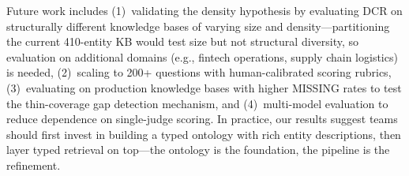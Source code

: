 \documentclass[11pt,a4paper]{article}
\begin{document}
Future work includes (1)~validating the density hypothesis by evaluating DCR on structurally different knowledge bases of varying size and density---partitioning the current 410-entity KB would test size but not structural diversity, so evaluation on additional domains (e.g., fintech operations, supply chain logistics) is needed, (2)~scaling to 200+ questions with human-calibrated scoring rubrics, (3)~evaluating on production knowledge bases with higher MISSING rates to test the thin-coverage gap detection mechanism, and (4)~multi-model evaluation to reduce dependence on single-judge scoring. In practice, our results suggest teams should first invest in building a typed ontology with rich entity descriptions, then layer typed retrieval on top---the ontology is the foundation, the pipeline is the refinement.

\end{document}
